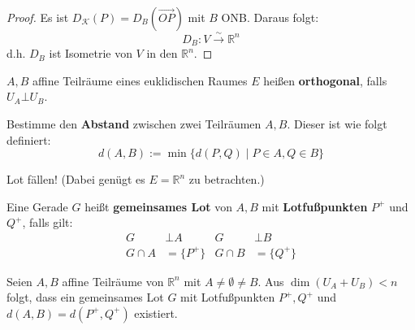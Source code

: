 \documentclass[parskip,a4paper,twoside,DIV15,BCOR12mm]{scrbook}
\begin{document}
\begin{proof}
Es ist $D_\mathcal{K}(P)=D_B(\overrightarrow{OP})$ mit $B$ ONB. Daraus folgt:
\[D_B:V\stackrel{\sim}{\to}\mathbb{R}^n\] 
d.h. $D_B$ ist Isometrie von $V$ in den $\mathbb{R}^n$.
\end{proof}

\begin{comment}
Im Standardraum gilt:
\[\Autdist(\mathbb{R}^n)=\{(A,a)\in\Homaff(\mathbb{R}^n,\mathbb{R}^n)\mid A\in O_n\}\]
\end{comment}

\begin{definition}
$A,B$ affine Teilräume eines euklidischen Raumes $E$ heißen \textbf{orthogonal}, falls
$U_A \bot U_B$.
\end{definition}

\begin{task}
Bestimme den \textbf{Abstand} zwischen zwei Teilräumen $A,B$. Dieser ist wie folgt definiert:
\[d(A,B):=\min\{d(P,Q)\mid P\in A,Q\in B\}\]
\end{task}

\begin{method}
Lot fällen! (Dabei genügt es $E=\mathbb{R}^n$ zu betrachten.)
\end{method}

\begin{definition}
Eine Gerade $G$ heißt \textbf{gemeinsames Lot} von $A,B$ mit \textbf{Lotfußpunkten} $P^+$ 
und $Q^+$, falls gilt:
\begin{align*}
G&\bot A &G&\bot B\\
G\cap A&=\{P^+\} &G\cap B&=\{Q^+\} 
\end{align*}
\end{definition}

\begin{theo}
\label{Satz 22.1}
Seien $A,B$ affine Teilräume von $\mathbb{R}^n$ mit $A\ne\emptyset\ne B$. Aus $\dim(U_A+U_B)<n$ folgt, dass
ein gemeinsames Lot $G$ mit Lotfußpunkten $P^+,Q^+$ und $d(A,B)=d(P^+,Q^+)$ existiert.
\end{theo}
\end{document}
